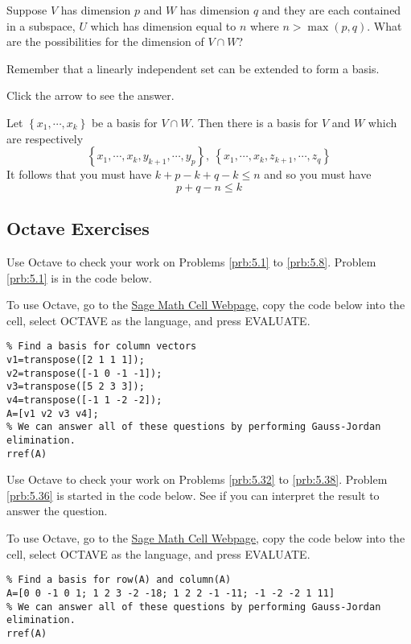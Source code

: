 \documentclass{ximera}
\begin{document}
\begin{problem}\label{prb:5.29} Suppose $V$ has dimension $p$ and $W$ has dimension $q$ and they
are each contained in a subspace, $U$ which has dimension equal to $n$ where
$n>\max \left( p,q\right).$ What are the possibilities for the dimension of
$V\cap W$? 

\begin{hint}
Remember that a linearly independent set can be extended to form a basis.
\end{hint}

Click the arrow to see the answer.
\begin{expandable}
Let $\left\{ x_{1},\cdots ,x_{k}\right\} $ be a
basis for $V\cap W.$ Then there is a basis for $V$ and $W$ which are
respectively
\[
\left\{ x_{1},\cdots ,x_{k},y_{k+1},\cdots ,y_{p}\right\} ,\ \left\{
x_{1},\cdots ,x_{k},z_{k+1},\cdots ,z_{q}\right\}
\]
It follows that you must have $k+p-k+q-k\leq n$ and so you must have
\[
p+q-n\leq k
\]
\end{expandable}
\end{problem}



\subsection*{Octave Exercises}
\begin{problem}\label{oct:find_dim_span_vectors}
Use Octave to check your work on Problems \ref{prb:5.1} to \ref{prb:5.8}.   Problem \ref{prb:5.1} is in the code below.  

To use Octave, go to the \href{https://sagecell.sagemath.org/}{Sage Math Cell Webpage}, copy the code below into the cell, select OCTAVE as the language, and press EVALUATE.

\begin{verbatim}
% Find a basis for column vectors
v1=transpose([2 1 1 1]);
v2=transpose([-1 0 -1 -1]);
v3=transpose([5 2 3 3]);
v4=transpose([-1 1 -2 -2]);
A=[v1 v2 v3 v4];
% We can answer all of these questions by performing Gauss-Jordan elimination.
rref(A)
\end{verbatim}
\end{problem}

\begin{problem}\label{oct:find_basis_important_subspaces}
Use Octave to check your work on Problems \ref{prb:5.32} to \ref{prb:5.38}.   Problem \ref{prb:5.36} is started in the code below.  See if you can interpret the result to answer the question.  

To use Octave, go to the \href{https://sagecell.sagemath.org/}{Sage Math Cell Webpage}, copy the code below into the cell, select OCTAVE as the language, and press EVALUATE.

\begin{verbatim}
% Find a basis for row(A) and column(A)
A=[0 0 -1 0 1; 1 2 3 -2 -18; 1 2 2 -1 -11; -1 -2 -2 1 11]
% We can answer all of these questions by performing Gauss-Jordan elimination.
rref(A)
\end{verbatim}
\end{problem}
\end{document}
